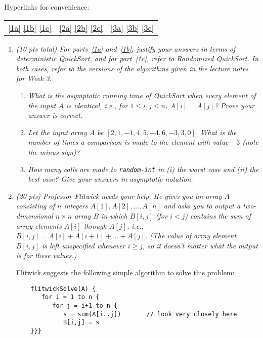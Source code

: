 \documentclass[12pt]{article}
\begin{document}
\renewcommand{\headrulewidth}{0.4pt}

Hyperlinks for convenience:
\begin{tabular}{lll}
\ref{1a} \ref{1b} \ref{1c} &
\ref{2a} \ref{2b} \ref{2c} &
\ref{3a} \ref{3b} \ref{3c}
\end{tabular}

\begin{enumerate}

	\item {\itshape (10 pts total) 
	For parts~\eqref{1a} and~\eqref{1b}, justify your answers in terms of deterministic QuickSort, and for part~\eqref{1c}, refer to Randomized QuickSort. In both cases, refer to the versions of the algorithms given in the lecture notes for Week 3.}
	\begin{enumerate}
	\item {\itshape \label{1a} What is the asymptotic running time of QuickSort when every element of the input $A$ is identical, i.e., for $1\leq i,j \leq n$, $A[i] = A[j]$? Prove your answer is correct.}
	\pagebreak
	
	\item {\itshape \label{1b} Let the input array $A$ be $[2, 1, -1, 4, 5, -4, 6, -3, 3, 0]$. What is the number of times a comparison is made to the element with value $-3$ (note the minus sign)?}
	\pagebreak
	
	\item {\itshape \label{1c} How many calls are made to {\tt random-int} in (i) the worst case and (ii) the best case? Give your answers in asymptotic notation.}
	\pagebreak
	
	\end{enumerate}

	\item {\itshape (20 pts) Professor Flitwick needs your help. He gives you an array $A$ consisting of $n$ integers $A[1], A[2], \dots , A[n]$ and asks you to output a two-dimensional $n\times n$ array $B$ in which $B[i,j]$ (for $i<j$) contains the sum of array elements $A[i]$ through $A[j]$, i.e., $B[i,j] = A[i]+A[i+1]+\dots+A[j]$. (The value of array element $B[i,j]$ is left unspecified whenever $i\geq j$, so it doesn't matter what the output is for these values.)
	
	Flitwick suggests the following simple algorithm to solve this problem:
	\begin{small}
	\begin{verbatim}
	flitwickSolve(A) {
	   for i = 1 to n {
	      for j = i+1 to n {
	         s = sum(A[i..j])       // look very closely here
	         B[i,j] = s
	}}}
	\end{verbatim}
	\end{small}}
	

\end{enumerate}
\end{document}
